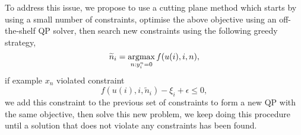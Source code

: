 To address this issue, we propose to use a cutting plane method which starts by using a small number of constraints,
optimise the above objective using an off-the-shelf QP solver,
then search new constraints using the following greedy strategy,
\begin{equation*}
\widetilde n_i = \operatorname*{argmax}_{n: y_i^n=0} f(u(i), i, n),
\end{equation*}
if example $x_n$ violated constraint
\begin{equation*}
f(u(i), i, \widetilde n_i) - \xi_i + \epsilon \le 0,
\end{equation*}
we add this constraint to the previous set of constraints to form a new QP with the same objective,
then solve this new problem, we keep doing this procedure until a solution that does not violate any constraints has been found.
